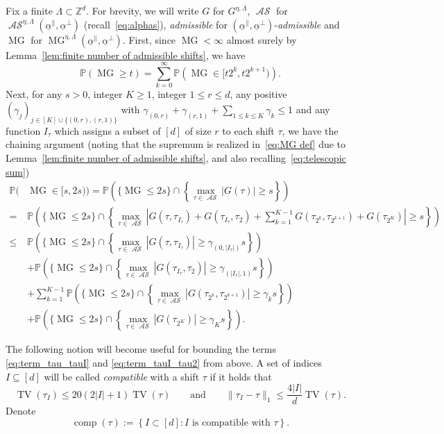 \documentclass[11pt, reqno]{amsart}
\newcommand{\Z}{\mathbb{Z}}
\DeclareMathOperator{\TV}{TV}
\DeclareMathOperator{\MG}{MG}
\DeclareMathOperator{\AS}{\mathcal{AS}}
\DeclareMathOperator{\comp}{comp}
\renewcommand{\P}{\mathbb{P}}
\numberwithin{equation}{section}
\begin{document}
Fix a finite $\Lambda\subset\Z^d$. For brevity, we will write 
$G$ for $G^{\eta,\Lambda}$, $\AS$ for $\AS^{\eta,\Lambda}(\underline{\alpha}^{\parallel},\underline{\alpha}^{\perp})$ (recall~\eqref{eq:alphas}), \emph{admissible} for $(\underline{\alpha}^{\parallel},\underline{\alpha}^{\perp})$-\emph{admissible}
and $\MG$ for $\MG^{\eta,\Lambda}(\underline{\alpha}^{\parallel},\underline{\alpha}^{\perp})$.
First, since $\MG<\infty$ almost surely by Lemma~\ref{lem:finite number of admissible shifts}, we have
\begin{equation*}
\P(\MG\ge t) = \sum_{k=0}^\infty\P\left(\MG\in[t2^k,t2^{k+1})\right).
\end{equation*}
Next, for any $s>0$, integer $K\ge 1$, integer $1\leq r \leq d$, any positive $(\gamma_j)_{j\in [K] \cup \{(0,r),(r,1) \}}$ with $\gamma_{(0,r)}+\gamma_{(r,1)}+\sum_{1\le k\le K}\gamma_k\le 1$ and any function $I_\tau$ which assigns a subset of $[d]$ of size $r$ to each shift $\tau$, we have the chaining argument (noting that the supremum is realized in~\eqref{eq:MG def} due to Lemma~\ref{lem:finite number of admissible shifts}, and also recalling~\eqref{eq:telescopic sum})
\begin{subequations}
\label{eq:term_tau_tau}
\begin{align}
\P(&\MG\in[s,2s))=\P\left(\{\MG\le 2s\}\cap\left\{\max_{\tau\in\AS} |G(\tau)|\ge s\right\}\right)\nonumber\\
=&\P\left(\{\MG\le 2s\}\cap\left\{\max_{\tau\in\AS} |G(\tau,\tau_{I_\tau})+G(\tau_{I_\tau},\tau_2)+\sum_{k=1}^{K-1}G(\tau_{2^k},\tau_{2^{k+1}})+G(\tau_{2^K})|\ge s\right\}\right)\nonumber\\
\le&\P\left(\{\MG\le 2s\}\cap\left\{\max_{\tau\in\AS} |G(\tau,\tau_{I_\tau})|\ge \gamma_{(0,|I_{\tau}|)} s\right\}\right)\label{eq:term_tau_tauI}\\
&+\P\left(\{\MG\le 2s\}\cap\left\{\max_{\tau\in\AS} |G(\tau_{I_\tau},\tau_2)|\ge \gamma_{(|I_{\tau}|,1)} s\right\}\right)\label{eq:term_tauI_tau2}\\
&+\sum_{k=1}^{K-1}\P\left(\{\MG\le 2s\}\cap\left\{\max_{\tau\in\AS} |G(\tau_{2^k},\tau_{2^{k+1}})|\ge \gamma_{k} s\right\}\right)\label{eq:term_tauM_tau2M}\\
&+\P\left(\{\MG\le 2s\}\cap\left\{\max_{\tau\in\AS} |G(\tau_{2^K})|\ge \gamma_{K} s\right\}\right).\label{eq:term_tau_last}
\end{align}
\end{subequations}

The following notion will become useful for bounding the terms \eqref{eq:term_tau_tauI} and \eqref{eq:term_tauI_tau2} from above.
A set of indices $I\subseteq[d]$ will be called \emph{compatible} with a shift $\tau$ if it holds that 
\begin{equation*}  \TV(\tau_{I}) \leq 20(2\lvert I\rvert+1) \TV(\tau)\qquad\text{and}\qquad\|\tau_{I}-\tau\|_1 \leq 
\frac{4\lvert I\rvert}{d} \TV(\tau).
\end{equation*}
Denote 
$$
\comp(\tau):=\left\{I\subset [d]\colon  I\text{ is compatible with }\tau\right\}.
$$
\end{document}
